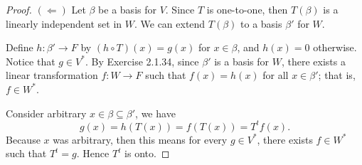 \begin{Exercise}
\begin{enumerate}[(a)]
\begin{proof}
			\vspace{2ex}
			
			$(\Longleftarrow)$
			Let $\beta$ be a basis for $V$. Since $T$ is one-to-one, then $T(\beta)$ is a linearly independent set in $W$. We can extend $T(\beta)$ to a basis $\beta'$ for $W$.
			
			Define $h:\beta'\to F$ by $(h\circ T)(x) = g(x)$ for $x\in \beta$, and $h(x) = 0$ otherwise. Notice that $g\in V^*$. 
			By Exercise 2.1.34, since $\beta'$ is a basis for $W$, there exists a linear transformation $f:W\to F$ such that $f(x)=h(x)$ for all $x\in \beta'$; that is, $f\in W^*$.
			
			Consider arbitrary $x\in\beta\subseteq\beta'$, we have
			$$
			g(x) = h(T(x)) = f(T(x)) = T^t f(x).
			$$
			Because $x$ was arbitrary, then this means for every $g\in V^*$, there exists $f\in W^*$ such that $T^t = g$. Hence $T^t$ is onto.
		\end{proof}
	\end{enumerate}
\end{Exercise}